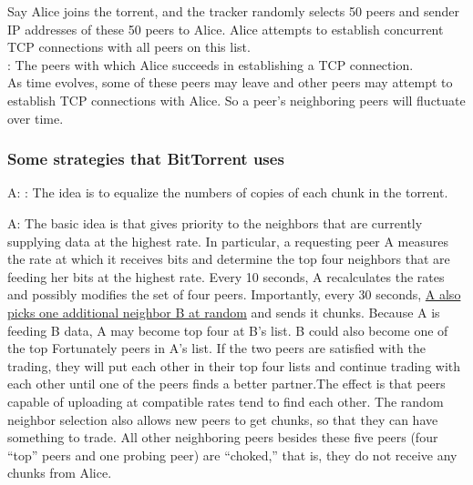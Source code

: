
Say Alice joins the torrent, and the tracker randomly selects 50 peers and sender
IP addresses of these 50 peers to Alice. Alice attempts to establish concurrent
TCP connections with all peers on this list.\\

: The peers with which Alice succeeds in establishing a TCP
connection.\\

As time evolves, some of these
peers may leave and other peers may attempt to establish TCP
connections with Alice. So a peer’s neighboring peers will fluctuate over time.\\

\subsubsection{Some strategies that BitTorrent uses}


\begin{description}[style=nextline]
    \item[Q: "which chunks should she request first from her
    neighbors?" and "which of her neighbors should she send requested
    chunks?"] A: : The idea is to equalize the numbers of copies of each chunk in the
    torrent.
    \item[Q: Which requests to respond to?] A: The basic idea is that gives priority to the neighbors that are 
    currently supplying data at the highest rate. In particular, a requesting peer A measures the rate at which it
    receives bits and determine the top four neighbors that are feeding her bits at the highest rate. Every 10 seconds, A recalculates the rates and possibly 
    modifies the set of four peers. Importantly, every 30 seconds, \underline{A also picks one additional neighbor B
    at random} and sends it chunks. Because A is feeding B data, A may become top four at B's list. B could also become one of the top Fortunately
    peers in A's list. If the two peers are satisfied with the trading, they will put each
    other in their top four lists and continue trading with each other until one of the peers
    finds a better partner.The effect is that peers capable of uploading at compatible rates
    tend to find each other. The random neighbor selection also allows new peers to get chunks, so that they can have something to trade. All other neighboring peers besides
    these five peers (four “top” peers and one probing peer) are “choked,” that is, they do
    not receive any chunks from Alice.
\end{description}



